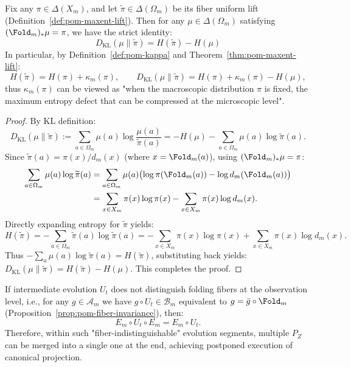 \begin{proposition}\label{prop:pom-kl-defect-identity}
Fix any $\pi\in\Delta(X_m)$, and let $\widetilde\pi\in\Delta(\Omega_m)$ be its fiber uniform lift (Definition~\ref{def:pom-maxent-lift}).
Then for any $\mu\in\Delta(\Omega_m)$ satisfying $(\Fold_m)_*\mu=\pi$, we have the strict identity:
\[
\boxed{\;
D_{\mathrm{KL}}(\mu\|\widetilde\pi)=H(\widetilde\pi)-H(\mu)\;}
\]
In particular, by Definition~\ref{def:pom-kappa} and Theorem~\ref{thm:pom-maxent-lift}:
\[
H(\widetilde\pi)=H(\pi)+\kappa_m(\pi),
\qquad
D_{\mathrm{KL}}(\mu\|\widetilde\pi)=H(\pi)+\kappa_m(\pi)-H(\mu),
\]
thus $\kappa_m(\pi)$ can be viewed as "when the macroscopic distribution $\pi$ is fixed, the maximum entropy defect that can be compressed at the microscopic level".
\end{proposition}

\begin{proof}
By KL definition:
\[
D_{\mathrm{KL}}(\mu\|\widetilde\pi):=\sum_{a\in\Omega_m}\mu(a)\log\frac{\mu(a)}{\widetilde\pi(a)}
=-H(\mu)-\sum_{a\in\Omega_m}\mu(a)\log\widetilde\pi(a).
\]
Since $\widetilde\pi(a)=\pi(x)/d_m(x)$ (where $x=\Fold_m(a)$), using $(\Fold_m)_*\mu=\pi$:
\[
\begin{aligned}
\sum_{a\in\Omega_m}\mu(a)\log\widetilde\pi(a)
&=\sum_{a\in\Omega_m}\mu(a)\bigl(\log\pi(\Fold_m(a))-\log d_m(\Fold_m(a))\bigr)\\
&=\sum_{x\in X_m}\pi(x)\log\pi(x)-\sum_{x\in X_m}\pi(x)\log d_m(x).
\end{aligned}
\]
Directly expanding entropy for $\widetilde\pi$ yields:
\[
H(\widetilde\pi)
=-\sum_{a\in\Omega_m}\widetilde\pi(a)\log\widetilde\pi(a)
=-\sum_{x\in X_m}\pi(x)\log\pi(x)+\sum_{x\in X_m}\pi(x)\log d_m(x).
\]
Thus $-\sum_a\mu(a)\log\widetilde\pi(a)=H(\widetilde\pi)$, substituting back yields:
\(
D_{\mathrm{KL}}(\mu\|\widetilde\pi)=H(\widetilde\pi)-H(\mu)
\).
This completes the proof.
\end{proof}

\begin{remark}\label{rem:pom-lazy-fold}
If intermediate evolution $U_t$ does not distinguish folding fibers at the observation level, i.e., for any $g\in\mathcal{A}_m$ we have $g\circ U_t\in\mathcal{B}_m$ equivalent to $g=\bar g\circ\Fold_m$ (Proposition~\ref{prop:pom-fiber-invariance}), then:
\[
E_m\circ U_t\circ E_m=E_m\circ U_t.
\]
Therefore, within such "fiber-indistinguishable" evolution segments, multiple $P_Z$ can be merged into a single one at the end, achieving postponed execution of canonical projection.
\end{remark}
